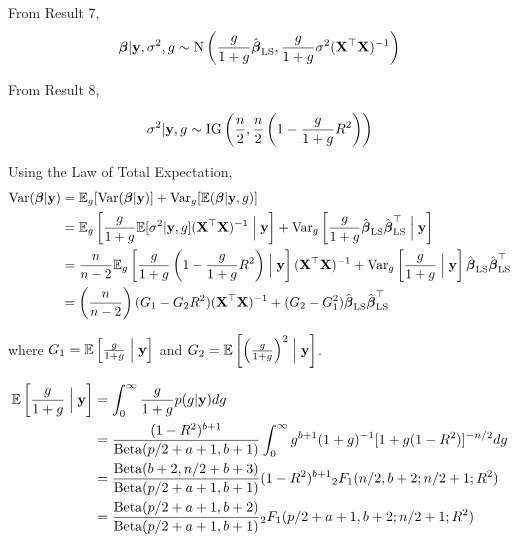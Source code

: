 \documentclass{amsart}[12pt]
\theoremstyle{definition}
\begin{document}
From Result 7,
\[
	{\boldsymbol \beta} | {\bf y}, \sigma^2, g \sim \text{N}\left(\frac{g}{1+g} \hat{{\boldsymbol \beta}}_{\text{LS}}, \frac{g}{1+g} \sigma^2 ({\bf X}^\top {\bf X})^{-1}\right)
\]

From Result 8,

\[
	\sigma^2 | {\bf y}, g \sim \text{IG}\left(\frac{n}{2}, \frac{n}{2} \left(1 - \frac{g}{1 + g} R^2\right)\right)
\]


Using the Law of Total Expectation,
\begin{align*}
	\text{Var}({\boldsymbol \beta} | {\bf y}) & = \mathbb{E}_g[\text{Var}({\boldsymbol \beta} | {\bf y})] + \text{Var}_g[\mathbb{E}({\boldsymbol \beta}|{\bf y}, g)]                                                                                                                                                 \\
	                   & = \mathbb{E}_g\left[\frac{g}{1 + g} \mathbb{E}[\sigma^2|{\bf y}, g] ({\bf X}^\top {\bf X})^{-1} \Bigm| {\bf y} \right] + \text{Var}_g\left[\frac{g}{1 + g} \hat{{\boldsymbol \beta}}_{\text{LS}} \hat{{\boldsymbol \beta}}_{\text{LS}}^\top \Bigm| {\bf y} \right]                                   \\
	                   & = \frac{n}{n - 2} \mathbb{E}_g\left[\frac{g}{1 + g} \left(1 - \frac{g}{1 + g} R^2 \right) \Bigm| {\bf y} \right] ({\bf X}^\top {\bf X})^{-1} + \text{Var}_g\left[\frac{g}{1 + g} \Bigm| {\bf y} \right] \hat{{\boldsymbol \beta}}_{\text{LS}} \hat{{\boldsymbol \beta}}_{\text{LS}}^\top \\
	                   & = \left( \frac{n}{n - 2} \right) (G_1 - G_2 R^2) ({\bf X}^\top {\bf X})^{-1} + (G_2 - G_1^2) \hat{{\boldsymbol \beta}}_{\text{LS}} \hat{{\boldsymbol \beta}}_{\text{LS}}^\top                                                                                      
\end{align*}

where $G_1 = \mathbb{E}\left[\frac{g}{1 + g} \Bigm| {\bf y} \right]$ and $G_2 = \mathbb{E}\left[ \left(\frac{g}{1 + g} \right)^2 \Bigm| {\bf y} \right]$.

\begin{align*}
	\mathbb{E}\left[\frac{g}{1 + g} \Bigm| {\bf y} \right] & = \int_0^\infty \frac{g}{1 + g} p(g | {\bf y}) dg                                                                      \\
	                                           & = \frac{(1 - R^2)^{b+1}}{\text{Beta}(p/2 + a + 1, b + 1)} \int_0^\infty g^{b+1} (1 + g)^{-1} [1 + g (1 - R^2)]^{-n/2} dg \\
	                                           & = \frac{\text{Beta}(b + 2, n/2 + b + 3)}{\text{Beta}(p /2 + a + 1, b + 1)} (1 - R^2)^{b+1} {}_2 F_1(n/2, b + 2; n/2 + 1; R^2)  \\
	                                           & = \frac{\text{Beta}(p/2 + a + 1, b + 2)}{\text{Beta}(p /2 + a + 1, b + 1)} {}_2 F_1(p/2 + a + 1, b + 2; n/2 + 1; R^2)              
\end{align*}
\end{document}
